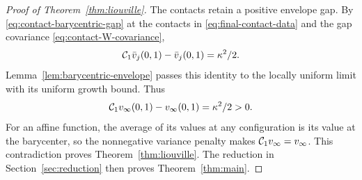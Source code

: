 \begin{proof}[Proof of Theorem~\ref{thm:liouville}]
The contacts retain a positive envelope gap. By \eqref{eq:contact-barycentric-gap} at the contacts in \eqref{eq:final-contact-data} and the gap covariance \eqref{eq:contact-W-covariance},
\[
  \mathcal{C}_1\bar v_j(0,1)-\bar v_j(0,1)=\kappa^2/2.
\]
Lemma~\ref{lem:barycentric-envelope} passes this identity to the locally uniform limit with its uniform growth bound. Thus
\[
  \mathcal{C}_1v_\infty(0,1)-v_\infty(0,1)=\kappa^2/2>0.
\]
For an affine function, the average of its values at any configuration is its value at the barycenter, so the nonnegative variance penalty makes $\mathcal{C}_1v_\infty=v_\infty$. This contradiction proves Theorem~\ref{thm:liouville}. The reduction in Section~\ref{sec:reduction} then proves Theorem~\ref{thm:main}.
\end{proof}
